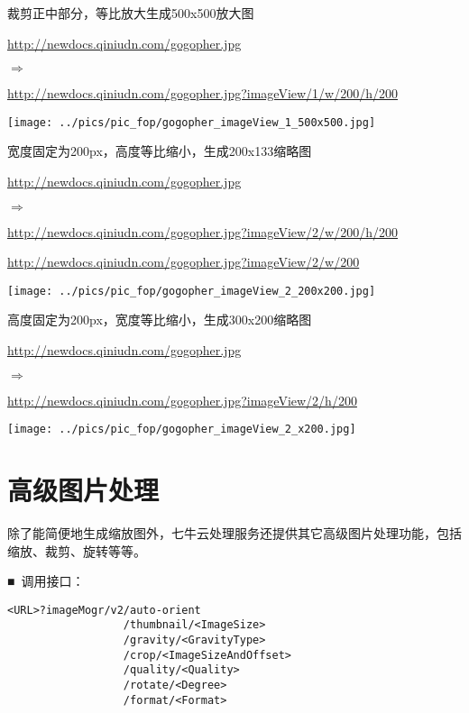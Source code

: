 \documentclass[11pt, oneside]{book}
\newcommand{\qsym}[1]{
\footnotesize
\noindent
#1\par
\normalsize
}
\newcommand{\qpara}[1]{
\vspace{0.3em}
\noindent
#1\par
\vspace{0.3em}
}
\newcommand{\qsamplelink}[1]{
\vspace{0.2em}
\noindent
#1\par
\vspace{0.1em}
}
\newcommand{\qurl}[1]{\footnotesize\url{#1}\normalsize}
\begin{document}
\begin{sample}
  \caption{裁剪正中部分，等比放大生成500x500放大图}
    \qsamplelink{\qurl{http://newdocs.qiniudn.com/gogopher.jpg}}
    \qsym{$\Rightarrow$}
    \qsamplelink{\qurl{http://newdocs.qiniudn.com/gogopher.jpg?imageView/1/w/200/h/200}}

    \begin{center}
      \texttt{[image: ../pics/pic\_fop/gogopher\_imageView\_1\_500x500.jpg]}
    \end{center}
  \label{imageView-1-500x500}
\end{sample}

\begin{sample}
  \caption{宽度固定为200px，高度等比缩小，生成200x133缩略图}
    \qsamplelink{\qurl{http://newdocs.qiniudn.com/gogopher.jpg}}
    \qsym{$\Rightarrow$}
    \qsamplelink{\qurl{http://newdocs.qiniudn.com/gogopher.jpg?imageView/2/w/200/h/200}}
    \qsamplelink{\qurl{http://newdocs.qiniudn.com/gogopher.jpg?imageView/2/w/200}}

    \begin{center}
      \texttt{[image: ../pics/pic\_fop/gogopher\_imageView\_2\_200x200.jpg]}
    \end{center}
  \label{imageView-2-200x200}
\end{sample}

\begin{sample}
  \caption{高度固定为200px，宽度等比缩小，生成300x200缩略图}
    \qsamplelink{\qurl{http://newdocs.qiniudn.com/gogopher.jpg}}
    \qsym{$\Rightarrow$}
    \qsamplelink{\qurl{http://newdocs.qiniudn.com/gogopher.jpg?imageView/2/h/200}}

    \begin{center}
      \texttt{[image: ../pics/pic\_fop/gogopher\_imageView\_2\_x200.jpg]}
    \end{center}
  \label{imageView-2-x200}
\end{sample}

\clearpage

\section{高级图片处理}

\qpara{除了能简便地生成缩放图外，七牛云处理服务还提供其它高级图片处理功能，包括缩放、裁剪、旋转等等。}
\qpara{■\ 调用接口：}
\begin{lstlisting}
<URL>?imageMogr/v2/auto-orient
                  /thumbnail/<ImageSize>
                  /gravity/<GravityType>
                  /crop/<ImageSizeAndOffset>
                  /quality/<Quality>
                  /rotate/<Degree>
                  /format/<Format>
\end{lstlisting}
\end{document}

